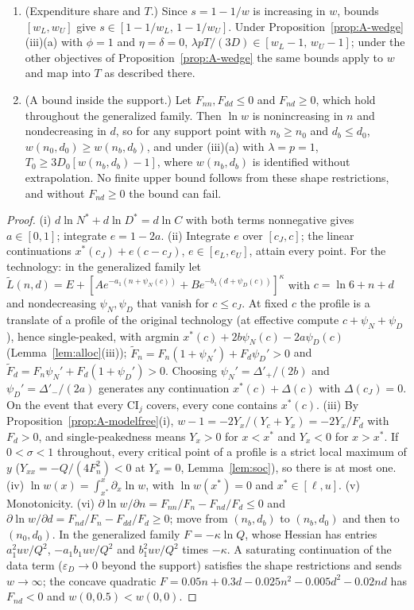 \begin{proposition}
\begin{enumerate}
\item[(v)] (Expenditure share and $T$.) Since $s=1-1/w$ is increasing in $w$, bounds $[w_L,w_U]$ give
$s\in[1-1/w_L,\,1-1/w_U]$. Under Proposition~\ref{prop:A-wedge}(iii)(a) with $\phi=1$ and $\eta=\delta=0$,
$\lambda pT/(3D)\in[w_L-1,\,w_U-1]$; under the other objectives of Proposition~\ref{prop:A-wedge} the same bounds apply to
$w$ and map into $T$ as described there.
\item[(vi)] (A bound inside the support.) Let $F_{nn},F_{dd}\le0$ and $F_{nd}\ge0$, which hold throughout the generalized
family. Then $\ln w$ is nonincreasing in $n$ and nondecreasing in $d$, so for any support point with $n_b\ge n_0$ and
$d_b\le d_0$, $w(n_0,d_0)\ge w(n_b,d_b)$, and under (iii)(a) with $\lambda=p=1$,
$T_0\ge3D_0[w(n_b,d_b)-1]$, where $w(n_b,d_b)$ is identified without extrapolation. No finite upper bound follows from
these shape restrictions, and without $F_{nd}\ge0$ the bound can fail.
\end{enumerate}
\end{proposition}

\begin{proof}
(i) $d\ln N^*+d\ln D^*=d\ln C$ with both terms nonnegative gives $a\in[0,1]$; integrate $e=1-2a$. (ii) Integrate $e$ over
$[c_J,c]$; the linear continuations $x^*(c_J)+e(c-c_J)$, $e\in[e_L,e_U]$, attain every point. For the technology: in the
generalized family let $\tilde L(n,d)=E+[Ae^{-a_1(n+\psi_N(c))}+Be^{-b_1(d+\psi_D(c))}]^\kappa$ with $c=\ln6+n+d$ and
nondecreasing $\psi_N,\psi_D$ that vanish for $c\le c_J$. At fixed $c$ the profile is a translate of a profile of the
original technology (at effective compute $c+\psi_N+\psi_D$), hence single-peaked, with argmin $x^*(c)+2b\psi_N(c)-2a\psi_D(c)$ (Lemma~\ref{lem:alloc}(iii));
$\tilde F_n=F_n(1+\psi_N')+F_d\psi_D'>0$ and $\tilde F_d=F_n\psi_N'+F_d(1+\psi_D')>0$. Choosing $\psi_N'=\Delta'_+/(2b)$ and
$\psi_D'=\Delta'_-/(2a)$ generates any continuation $x^*(c)+\Delta(c)$ with $\Delta(c_J)=0$. On the event that every
$\mathrm{CI}_j$ covers, every cone contains $x^*(c)$. (iii) By Proposition~\ref{prop:A-modelfree}(i),
$w-1=-2Y_x/(Y_c+Y_x)=-2Y_x/F_d$ with $F_d>0$, and single-peakedness means $Y_x>0$ for $x<x^*$ and $Y_x<0$ for $x>x^*$. If
$0<\sigma<1$ throughout, every critical point of a profile is a strict local maximum of $y$
($Y_{xx}=-Q/(4F_n^2)<0$ at $Y_x=0$, Lemma~\ref{lem:soc}), so there is at most one. (iv) $\ln w(x)=\int_{x^*}^x\partial_x\ln w$,
with $\ln w(x^*)=0$ and $x^*\in[\ell,u]$. (v) Monotonicity. (vi) $\partial\ln w/\partial n=F_{nn}/F_n-F_{nd}/F_d\le0$ and
$\partial\ln w/\partial d=F_{nd}/F_n-F_{dd}/F_d\ge0$; move from $(n_b,d_b)$ to $(n_b,d_0)$ and then to $(n_0,d_0)$. In the
generalized family $F=-\kappa\ln Q$, whose Hessian has entries $a_1^2uv/Q^2$, $-a_1b_1uv/Q^2$ and $b_1^2uv/Q^2$ times
$-\kappa$. A saturating continuation of the data term ($\varepsilon_D\to0$ beyond the support) satisfies the shape
restrictions and sends $w\to\infty$; the concave quadratic $F=0.05n+0.3d-0.025n^2-0.005d^2-0.02nd$ has $F_{nd}<0$ and
$w(0,0.5)<w(0,0)$.
\end{proof}

